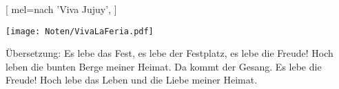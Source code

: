[
    mel={nach 'Viva Jujuy'},
]

\beginverse
\endverse
\texttt{[image: Noten/VivaLaFeria.pdf]}

\endsong

\beginscripture{}
Übersetzung:
Es lebe das Fest, es lebe der Festplatz, es lebe die Freude!
Hoch leben die bunten Berge meiner Heimat.
Da kommt der Gesang. Es lebe die Freude!
Hoch lebe das Leben und die Liebe meiner Heimat.
\endscripture